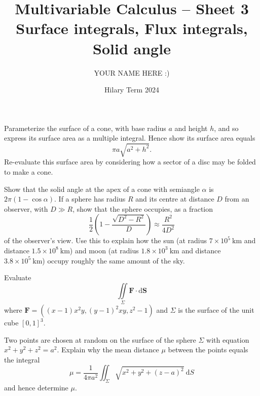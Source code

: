 \documentclass[answers]{exam}
\title{Multivariable Calculus -- Sheet 3\\Surface integrals, Flux integrals, Solid angle}
\author{YOUR NAME HERE :)}
\date{Hilary Term 2024}
\begin{document}
\maketitle
\begin{questions}

\question%
Parameterize the surface of a cone, with base radius $a$ and height $h$, and so express its surface area as a multiple integral. Hence show its surface area equals \[
	\pi a \sqrt{a^{2}+h^{2}}.
\] Re-evaluate this surface area by considering how a sector of a disc may be folded to make a cone.



\question%
Show that the solid angle at the apex of a cone with semiangle $\alpha$ is $2 \pi(1-\cos \alpha)$. If a sphere has radius $R$ and its centre at distance $D$ from an observer, with $D \gg R$, show that the sphere occupies, as a fraction \[
	\frac{1}{2}\left(1-\frac{\sqrt{D^{2}-R^{2}}}{D}\right) \approx \frac{R^{2}}{4 D^{2}}
\] of the observer's view. Use this to explain how the sun (at radius $7 \times 10^{5} \mathrm{~km}$ and distance $1.5 \times 10^{8} \mathrm{~km}$) and moon (at radius $1.8 \times 10^{3} \mathrm{~km}$ and distance $3.8 \times 10^{5} \mathrm{~km}$) occupy roughly the same amount of the sky.



\question%
Evaluate \[
	\iint\limits_{\Sigma} \mathbf{F} \cdot \mathrm{d} \mathbf{S}
\] where $\mathbf{F}=\left((x-1) x^{2} y,(y-1)^{2} x y, z^{2}-1\right)$ and $\Sigma$ is the surface of the unit cube $[0,1]^{3}$.



\question%
Two points are chosen at random on the surface of the sphere $\Sigma$ with equation $x^{2}+y^{2}+z^{2}=a^{2}$. Explain why the mean distance $\mu$ between the points equals the integral \[
	\mu=\frac{1}{4 \pi a^{2}} \iint_{\Sigma} \sqrt{x^{2}+y^{2}+(z-a)^{2}} \mathrm{~d} S
\] and hence determine $\mu$.



\question%
\end{questions}
\end{document}

